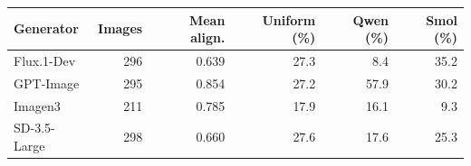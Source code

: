 

\footnotesize
\begin{tabular*}{\textwidth}{@{\extracolsep{\fill}}lrrrrr}
\toprule
Generator & Images & Mean align. & Uniform (\%) & Qwen (\%) & Smol (\%)\\
\midrule
Flux.1-Dev & 296 & 0.639 & 27.3 & 8.4 & 35.2\\
GPT-Image & 295 & 0.854 & 27.2 & 57.9 & 30.2\\
Imagen3 & 211 & 0.785 & 17.9 & 16.1 & 9.3\\
SD-3.5-Large & 298 & 0.660 & 27.6 & 17.6 & 25.3\\
\bottomrule
\end{tabular*}
